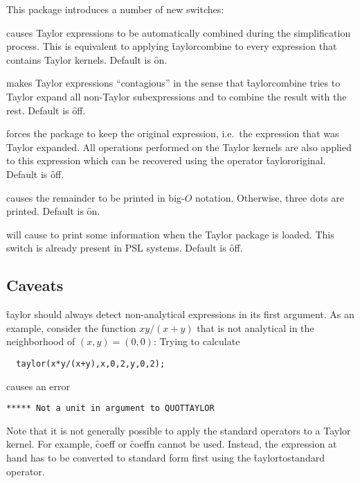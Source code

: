 This package introduces a number of new switches:
\begin{description}

\item[\sw{taylorautocombine}] \hypertarget{switch:TAYLORAUTOCOMBINE}{}causes
    Taylor expressions to be automatically combined during the simplification
    process.  This is equivalent to applying \f{taylorcombine} to
    every expression that contains Taylor kernels.
    Default is \f{on}.

\item[\sw{taylorautoexpand}] \hypertarget{switch:TAYLORAUTOEXPAND}{} makes Taylor expressions ``contagious''
    in the sense that \f{taylorcombine} tries to Taylor expand
    all non-Taylor subexpressions and to combine the result with the
    rest. Default is \f{off}.

\hypertarget{switch:TAYLORKEEPORIGINAL}{}
\item[\sw{taylorkeeporiginal}] forces the
    package to keep the original expression, i.e.\ the expression
    that was Taylor expanded.  All operations performed on the
    Taylor kernels are also applied to this expression  which can
    be recovered using the operator \f{taylororiginal}.
    Default is \f{off}.

\hypertarget{switch:TAYLORPRINTORDER}{}
\item[\sw{taylorprintorder}] causes the
    remainder to be printed in big-$O$ notation.  Otherwise, three
    dots are printed. Default is \f{on}.

\item[\sw{verboseload}] will cause
    \REDUCE{} to print some information when the Taylor package is
    loaded.  This switch is already present in \textsf{PSL} systems.
    Default is \f{off}.

\end{description}

\subsection{Caveats}

\f{taylor} should always detect non-analytical expressions in
its first argument. As an example, consider the function $xy/(x+y)$
that is not analytical in the neighborhood of $(x,y) = (0,0)$: Trying
to calculate
\begin{verbatim}
  taylor(x*y/(x+y),x,0,2,y,0,2);
\end{verbatim}
causes an error
\begin{verbatim}
***** Not a unit in argument to QUOTTAYLOR
\end{verbatim}
Note that it is not generally possible to apply the standard \REDUCE{}
operators to a Taylor kernel. For example, \f{coeff}
or \f{coeffn} cannot be used. Instead, the expression at hand has
to be converted to standard form first using the \f{taylortostandard}
operator.

